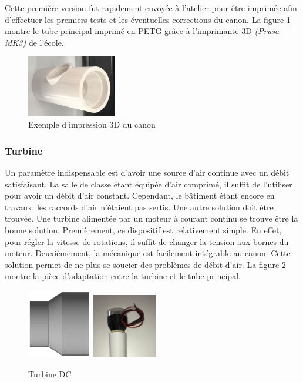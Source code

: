 Cette première version fut rapidement envoyée à l’atelier pour être imprimée afin d’effectuer 
les premiers tests et les éventuelles corrections du canon. La figure \ref{fig:3DPrintCanon} montre 
le tube principal imprimé en PETG grâce à l’imprimante 3D \emph{(Prusa MK3)} de l’école.

\begin{figure}[H]
    \centering
    \includegraphics[width=0.35\textwidth]{Images/photos_PGA/CanonBloc.jpg}
    \caption{Exemple d'impression 3D du canon}
    \label{fig:3DPrintCanon}
\end{figure}

\subsubsection{Turbine}

Un paramètre indispensable est d’avoir une source d’air continue avec un débit satisfaisant. La salle de classe étant 
équipée d’air comprimé, il suffit de l’utiliser pour avoir un débit d’air constant. Cependant, 
le bâtiment étant encore en travaux, les raccords d’air n’étaient pas sertis. Une autre solution doit 
être trouvée. Une turbine alimentée par un moteur à courant continu se trouve être la bonne 
solution. Premièrement, ce dispositif est relativement simple. En effet, pour régler la vitesse de rotations, il suffit 
de changer la tension aux bornes du moteur. Deuxièmement, la mécanique est facilement intégrable 
au canon. Cette solution permet de ne plus se soucier des problèmes de débit d’air. La figure \ref{fig:turbine}
montre la pièce d'adaptation entre la turbine et le tube principal.

\begin{figure}[H]
    \centering
    \includegraphics[width=0.25\textwidth]{Images/photos_PGA/adaptmotventi.PNG}
    \includegraphics[width=0.25\textwidth]{Images/photos_PGA/zoomTurbine.jpg}
    \caption{Turbine DC}
    \label{fig:turbine}
\end{figure}

